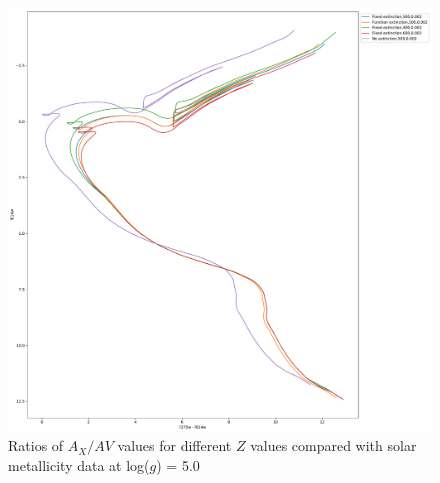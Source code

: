 \documentclass[a4paper, 11pt, oneside]{LJMU_Astro_Thesis}  %
\begin{document}
\begin{figure}[h]
\begin{center}
\includegraphics[scale=0.3]{../basti_isochrones_10_13Gyr/Extinction_T5k_FeH0fix_func_f814w_f275wmf814w_500_400_600_Myr_FeH_0p002_ref_noext_Av_1p0.pdf}
\caption{Ratios of $A_{X}/A{V}$ values for different $Z$ values compared with solar metallicity data at log($g$) = 5.0}
\label{wfc3_isoc2_T5k}
\end{center}
\end{figure}
\end{document}
